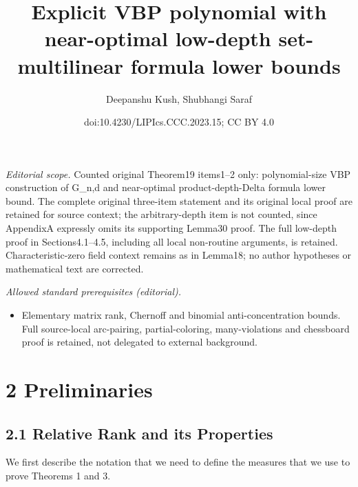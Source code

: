 \documentclass[10pt,a4paper]{article}
\title{Explicit VBP polynomial with near-optimal low-depth set-multilinear formula lower bounds}
\author{Deepanshu Kush, Shubhangi Saraf}
\date{doi:10.4230/LIPIcs.CCC.2023.15; CC BY 4.0}
\begin{document}
\maketitle
\noindent\textit{Editorial scope.} Counted original Theorem19 items1–2 only: polynomial-size VBP construction of G\_n,d and near-optimal product-depth-Delta formula lower bound. The complete original three-item statement and its original local proof are retained for source context; the arbitrary-depth item is not counted, since AppendixA expressly omits its supporting Lemma30 proof. The full low-depth proof in Sections4.1–4.5, including all local non-routine arguments, is retained. Characteristic-zero field context remains as in Lemma18; no author hypotheses or mathematical text are corrected.\par\medskip
\noindent\textit{Allowed standard prerequisites (editorial).}\begin{itemize}
\item Elementary matrix rank, Chernoff and binomial anti-concentration bounds. Full source-local arc-pairing, partial-coloring, many-violations and chessboard proof is retained, not delegated to external background.
\end{itemize}\medskip
\section*{2 Preliminaries}
\subsection*{2.1 Relative Rank and its Properties}
We first describe the notation that we need to define the measures that we use to prove Theorems 1 and 3.
\end{document}
